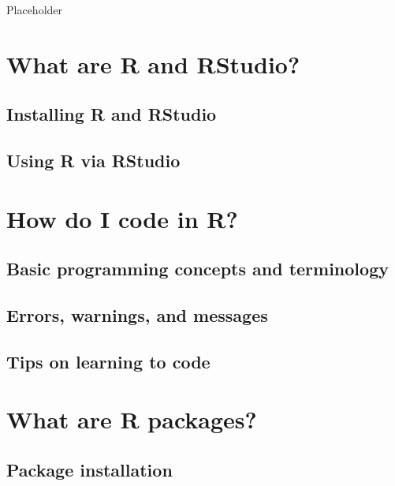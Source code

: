 \documentclass[12pt, krantz2,]{krantz}
\begin{document}
Placeholder

\hypertarget{r-rstudio}{%
\section{What are R and RStudio?}\label{r-rstudio}}

\hypertarget{installing-r-and-rstudio}{%
\subsection{Installing R and RStudio}\label{installing-r-and-rstudio}}

\hypertarget{using-r-via-rstudio}{%
\subsection{Using R via RStudio}\label{using-r-via-rstudio}}

\hypertarget{code}{%
\section{How do I code in R?}\label{code}}

\hypertarget{programming-concepts}{%
\subsection{Basic programming concepts and terminology}\label{programming-concepts}}

\hypertarget{errors-warnings-and-messages}{%
\subsection{Errors, warnings, and messages}\label{errors-warnings-and-messages}}

\hypertarget{tips-on-learning-to-code}{%
\subsection{Tips on learning to code}\label{tips-on-learning-to-code}}

\hypertarget{packages}{%
\section{What are R packages?}\label{packages}}

\hypertarget{package-installation}{%
\subsection{Package installation}\label{package-installation}}
\end{document}
